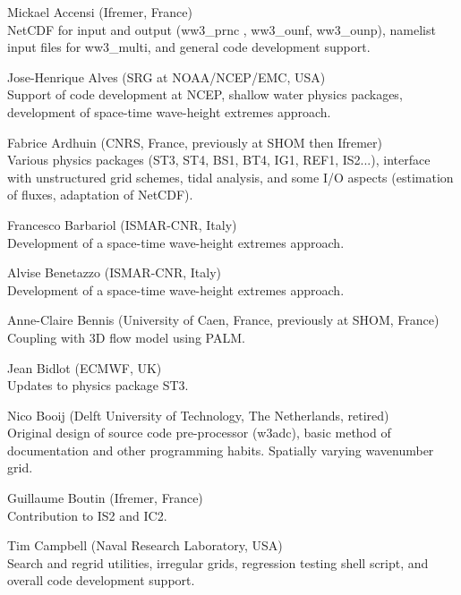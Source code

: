 \begin{list}{\ldots}{ }

\item [Mickael Accensi] (Ifremer, France) \\
  NetCDF for input and output (ww3\_prnc , ww3\_ounf, ww3\_ounp), namelist input files for ww3\_multi, and general code development support.

\item [Jose-Henrique Alves] (SRG at NOAA/NCEP/EMC, USA) \\
  Support of code development at NCEP, shallow water physics packages, development of space-time wave-height extremes approach.

\item [Fabrice Ardhuin] (CNRS, France, previously at SHOM then Ifremer) \\
  Various physics packages (ST3, ST4, BS1, BT4, IG1, REF1, IS2...), interface with unstructured grid schemes, tidal analysis, and some I/O aspects (estimation of fluxes, adaptation of NetCDF). 

\item [Francesco Barbariol] (ISMAR-CNR, Italy) \\
  Development of a space-time wave-height extremes approach.

\item [Alvise Benetazzo] (ISMAR-CNR, Italy) \\
  Development of a space-time wave-height extremes approach.

\item [Anne-Claire Bennis] (University of Caen, France, previously at SHOM, France) \\
  Coupling with 3D flow model using PALM.

\item [Jean Bidlot] (ECMWF, UK) \\
  Updates to physics package ST3.

\item [Nico Booij] (Delft University of Technology, The Netherlands, retired) \\
  Original design of source code pre-processor ({\code w3adc}), basic method
  of documentation and other programming habits. Spatially varying wavenumber
  grid.

\item [Guillaume Boutin] (Ifremer, France) \\
  Contribution to IS2 and IC2. 

\item [Tim Campbell] (Naval Research Laboratory, USA)\\ 
  Search and regrid utilities, irregular grids, regression testing shell script, and overall code development support.


\end{list}
